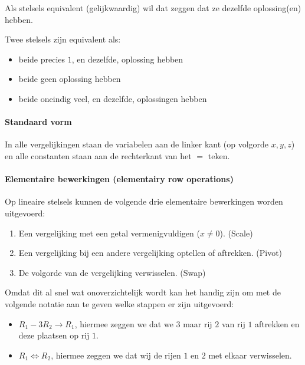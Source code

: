 \documentclass[11pt]{article}
\providecommand{\tightlist}{%
      \setlength{\itemsep}{0pt}\setlength{\parskip}{0pt}}
\begin{document}
    Als stelsels equivalent (gelijkwaardig) wil dat zeggen dat ze dezelfde
oplossing(en) hebben.

Twee stelsels zijn equivalent als:

\begin{itemize}
\tightlist
\item
  beide precies \(1\), en dezelfde, oplossing hebben
\item
  beide geen oplossing hebben
\item
  beide oneindig veel, en dezelfde, oplossingen hebben
\end{itemize}

    \hypertarget{standaard-vorm}{%
\paragraph{Standaard vorm}\label{standaard-vorm}}

    In alle vergelijkingen staan de variabelen aan de linker kant (op
volgorde \(x,y,z\)) en alle constanten staan aan de rechterkant van het
\(=\) teken.

    \hypertarget{elementaire-bewerkingen-elementairy-row-operations}{%
\paragraph{Elementaire bewerkingen (elementairy row
operations)}\label{elementaire-bewerkingen-elementairy-row-operations}}

    Op lineaire stelsels kunnen de volgende drie elementaire bewerkingen
worden uitgevoerd:

\begin{enumerate}
\def\labelenumi{\arabic{enumi}.}
\tightlist
\item
  Een vergelijking met een getal vermenigvuldigen (\(x\not=0\)). (Scale)
\item
  Een vergelijking bij een andere vergelijking optellen of aftrekken.
  (Pivot)
\item
  De volgorde van de vergelijking verwisselen. (Swap)
\end{enumerate}

Omdat dit al snel wat onoverzichtelijk wordt kan het handig zijn om met
de volgende notatie aan te geven welke stappen er zijn uitgevoerd:

\begin{itemize}
\tightlist
\item
  \(R_1 - 3R_2 \rightarrow R_1\), hiermee zeggen we dat we \(3\) maar
  rij \(2\) van rij \(1\) aftrekken en deze plaatsen op rij \(1\).
\item
  \(R_1 \iff R_2\), hiermee zeggen we dat wij de rijen \(1\) en \(2\)
  met elkaar verwisselen.
\end{itemize}
\end{document}

